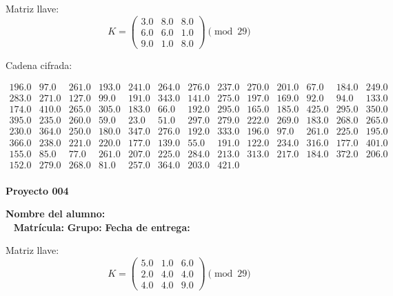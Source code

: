 \documentclass[12pt]{article}
\begin{document}
\medskip

Matriz llave:
\[
K = \begin{pmatrix}
3.0 & 8.0 & 8.0\\
6.0 & 6.0 & 1.0\\
9.0 & 1.0 & 8.0
\end{pmatrix} \pmod{29}
\]

Cadena cifrada:
\begin{center}
$\begin{array}{lllllllllllll}
196.0 & 97.0 & 261.0 & 193.0 & 241.0 & 264.0 & 276.0 & 237.0 & 270.0 & 201.0 & 67.0 & 184.0 & 249.0\\
283.0 & 271.0 & 127.0 & 99.0 & 191.0 & 343.0 & 141.0 & 275.0 & 197.0 & 169.0 & 92.0 & 94.0 & 133.0\\
174.0 & 410.0 & 265.0 & 305.0 & 183.0 & 66.0 & 192.0 & 295.0 & 165.0 & 185.0 & 425.0 & 295.0 & 350.0\\
395.0 & 235.0 & 260.0 & 59.0 & 23.0 & 51.0 & 297.0 & 279.0 & 222.0 & 269.0 & 183.0 & 268.0 & 265.0\\
230.0 & 364.0 & 250.0 & 180.0 & 347.0 & 276.0 & 192.0 & 333.0 & 196.0 & 97.0 & 261.0 & 225.0 & 195.0\\
366.0 & 238.0 & 221.0 & 220.0 & 177.0 & 139.0 & 55.0 & 191.0 & 122.0 & 234.0 & 316.0 & 177.0 & 401.0\\
155.0 & 85.0 & 77.0 & 261.0 & 207.0 & 225.0 & 284.0 & 213.0 & 313.0 & 217.0 & 184.0 & 372.0 & 206.0\\
152.0 & 279.0 & 268.0 & 81.0 & 257.0 & 364.0 & 203.0 & 421.0\\
\end{array}$
\end{center}

\newpage


\textbf{Proyecto 004}

\textbf{Nombre del alumno:} \underline{\hspace{13cm}}\\\
\vspace{1cm}
\textbf{Matrícula:} \underline{\hspace{4cm}} \hspace{1cm}
\textbf{Grupo:} \underline{\hspace{2cm}}
\textbf{Fecha de entrega:} \underline{\hspace{2cm}}

\medskip

Matriz llave:
\[
K = \begin{pmatrix}
5.0 & 1.0 & 6.0\\
2.0 & 4.0 & 4.0\\
4.0 & 4.0 & 9.0
\end{pmatrix} \pmod{29}
\]
\end{document}
